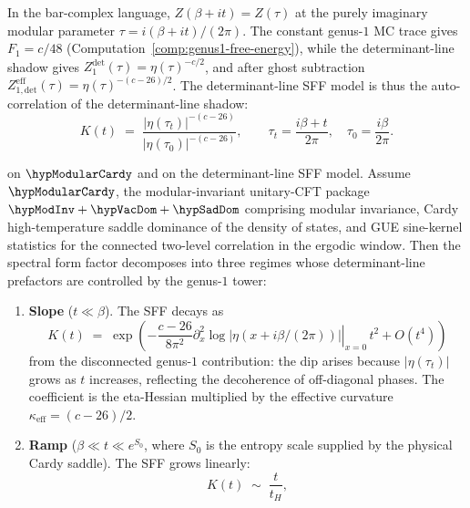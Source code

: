 In the bar-complex language, $Z(\beta+it) = Z(\tau)$ at the
purely imaginary modular parameter
$\tau = i(\beta+it)/(2\pi)$. The constant genus-$1$ MC trace gives
$F_1=c/48$ (Computation~\ref{comp:genus1-free-energy}), while the
determinant-line shadow gives
$Z_1^{\mathrm{det}}(\tau) = \eta(\tau)^{-c/2}$, and after ghost
subtraction
$Z_{1,\mathrm{det}}^{\mathrm{eff}}(\tau)
= \eta(\tau)^{-(c-26)/2}$. The determinant-line SFF model is thus the
auto-correlation of the determinant-line shadow:
\begin{equation}\label{eq:sff-bar-complex}
K(t)
\;=\;
\frac{|\eta(\tau_t)|^{-(c-26)}}
 {|\eta(\tau_0)|^{-(c-26)}},
\qquad
\tau_t = \frac{i\beta + t}{2\pi},
\quad
\tau_0 = \frac{i\beta}{2\pi}.
\end{equation}

\begin{theorem}
\label{thm:sff-decomposition}%
%
\ClaimStatusConditional{} on $\hypModularCardy$ and on the
determinant-line SFF model.
Assume $\hypModularCardy$, the modular-invariant unitary-CFT package
$\hypModInv + \hypVacDom + \hypSadDom$ comprising modular invariance,
Cardy high-temperature saddle dominance of the density of states, and
GUE sine-kernel statistics for the connected two-level correlation in
the ergodic window. Then the spectral
form factor decomposes into three regimes whose determinant-line
prefactors are controlled by the genus-$1$ tower:
\begin{enumerate}[label=\textup{(\roman*)}]
\item \textbf{Slope} ($t \ll \beta$). The SFF decays as
 \begin{equation}\label{eq:sff-slope}
 K(t) \;=\; \exp\!\left(
 -\frac{c-26}{8\pi^2}
 \left.\partial_x^2\log
 |\eta(x+i\beta/(2\pi))|\right|_{x=0}\,t^2
 +O(t^4)\right)
 \end{equation}
 from the disconnected genus-$1$ contribution: the dip arises
 because $|\eta(\tau_t)|$ grows as $t$ increases, reflecting
 the decoherence of off-diagonal phases. The coefficient is the
eta-Hessian multiplied by the effective curvature
$\kappa_{\mathrm{eff}}=(c-26)/2$.
\item \textbf{Ramp} ($\beta \ll t \ll e^{S_0}$, where
 \(S_0\) is the entropy scale supplied by the physical Cardy saddle).
 The SFF grows linearly:
 \begin{equation}\label{eq:sff-ramp}
 K(t) \;\sim\; \frac{t}{t_H},

\end{equation}
\end{enumerate}
\end{theorem}
